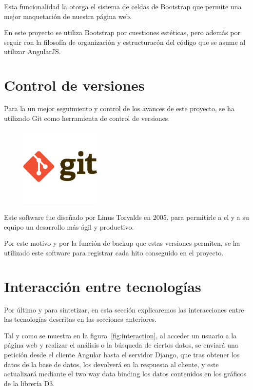 \documentclass[a4paper, spanish, 12pt]{book}
\begin{document}
Esta funcionalidad la otorga el sistema de celdas de Bootstrap que permite una
mejor maquetaci\'on de nuestra p\'agina web.

En este proyecto se utiliza Bootstrap por cuestiones est\'eticas, pero adem\'as por
seguir con la filosof\'ia de organizaci\'on y estructurac\'on del c\'odigo que se
asume al utilizar AngularJS.

\section{Control de versiones}
\label{sec:git}

Para la un mejor seguimiento y control de los avances de este proyecto, se ha
utilizado Git como herramienta de control de versiones.

\begin{figure}[H]
  \centering
  \includegraphics[width=4cm, keepaspectratio]{img/git-logo}
\end{figure}

Este software fue dise\~nado por Linus Torvalds en 2005, para permitirle a el
y a su equipo un desarrollo m\'as \'agil y productivo.

Por este motivo y por la funci\'on de backup que estas versiones permiten,
se ha utilizado este software para registrar cada hito conseguido en el proyecto.

\section{Interacci\'on entre tecnolog\'ias}
\label{sec:interaction}

Por \'ultimo y para sintetizar, en esta secci\'on explicaremos las interacciones
entre las tecnolog\'ias descritas en las secciones anteriores.

Tal y como se muestra en la figura~\ref{fig:interaction}, al acceder un usuario
a la p\'agina web y realizar el an\'alisis o la b\'usqueda de ciertos datos, se enviar\'a
una petici\'on desde el cliente Angular hasta el servidor Django, que tras obtener
los datos de la base de datos, los devolver\'a en la respuesta al cliente, y este
actualizar\'a mediante el two way data binding los datos contenidos en los gr\'aficos
de la librer\'ia D3.
\end{document}
